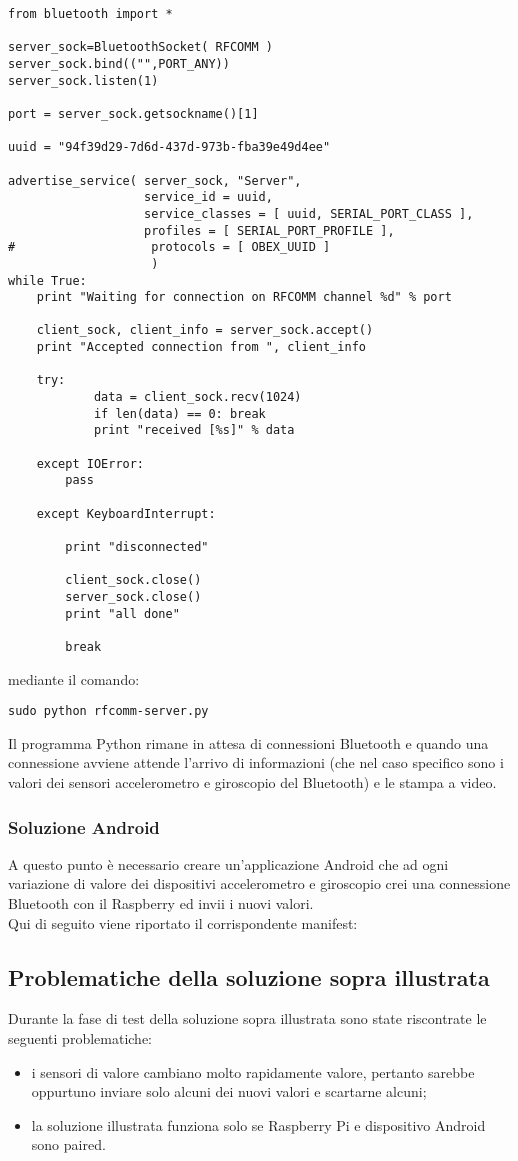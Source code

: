 \documentclass{article}
\begin{document}
\begin{lstlisting}
from bluetooth import *

server_sock=BluetoothSocket( RFCOMM )
server_sock.bind(("",PORT_ANY))
server_sock.listen(1)

port = server_sock.getsockname()[1]

uuid = "94f39d29-7d6d-437d-973b-fba39e49d4ee"

advertise_service( server_sock, "Server",
                   service_id = uuid,
                   service_classes = [ uuid, SERIAL_PORT_CLASS ],
                   profiles = [ SERIAL_PORT_PROFILE ], 
#                   protocols = [ OBEX_UUID ] 
                    )
while True:          
	print "Waiting for connection on RFCOMM channel %d" % port

	client_sock, client_info = server_sock.accept()
	print "Accepted connection from ", client_info

	try:
	        data = client_sock.recv(1024)
        	if len(data) == 0: break
	        print "received [%s]" % data

	except IOError:
		pass

	except KeyboardInterrupt:

		print "disconnected"

		client_sock.close()
		server_sock.close()
		print "all done"

		break
\end{lstlisting}
mediante il comando:
\begin{lstlisting}
sudo python rfcomm-server.py
\end{lstlisting}
Il programma Python rimane in attesa di connessioni Bluetooth e quando una connessione avviene attende l'arrivo di informazioni (che nel caso specifico sono i valori dei sensori accelerometro e giroscopio del Bluetooth) e le stampa a video.
\subsubsection{Soluzione Android}
A questo punto è necessario creare un'applicazione Android che ad ogni variazione di valore dei dispositivi accelerometro e giroscopio crei una connessione Bluetooth con il Raspberry ed invii i nuovi valori. \\

Qui di seguito viene riportato il corrispondente manifest:

\subsection{Problematiche della soluzione sopra illustrata}
Durante la fase di test della soluzione sopra illustrata sono state riscontrate le seguenti problematiche:
\begin{itemize}
    \item i sensori di valore cambiano molto rapidamente valore, pertanto sarebbe oppurtuno inviare solo alcuni dei nuovi valori e scartarne alcuni;
    \item la soluzione illustrata funziona solo se Raspberry Pi e dispositivo Android sono paired.
\end{itemize}
\end{document}
